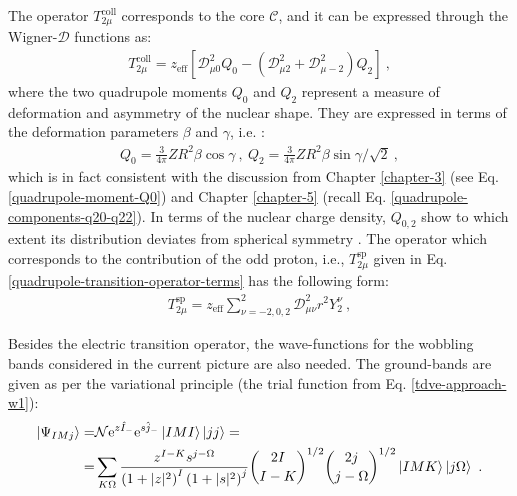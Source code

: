 The operator $T_{2\mu}^\text{coll}$ corresponds to the core $\mathscr{C}$, and it can be expressed through the Wigner-$\mathcal{D}$ functions as:
\begin{align}
    T_{2\mu}^\text{coll}=z_\text{eff}\left[\mathcal{D}_{\mu 0}^2Q_{0}-\left(\mathcal{D}_{\mu 2}^2+\mathcal{D}_{\mu -2}^2\right)Q_{2}\right]\ ,
    \label{electric-quadrupole-T-coll}
\end{align}
where the two quadrupole moments $Q_{0}$ and $Q_{2}$ represent a measure of deformation and asymmetry of the nuclear shape. They are expressed in terms of the deformation parameters $\beta$ and $\gamma$, i.e. \cite{raduta2018wobbling}:
\begin{align}
    Q_{0}=\frac{3}{4\pi}ZR^2\beta\cos\gamma\ ,\ Q_{2}=\frac{3}{4\pi}ZR^2\beta\sin\gamma/\sqrt{2}\ ,
    \label{quadrupole-components-Q0-Q2}
\end{align}
which is in fact consistent with the discussion from Chapter \ref{chapter-3} (see Eq. \ref{quadrupole-moment-Q0}) and Chapter \ref{chapter-5} (recall Eq. \ref{quadrupole-components-q20-q22}). In terms of the nuclear charge density, $Q_{0,2}$ show to which extent its distribution deviates from spherical symmetry \cite{bohr1998nuclear}. The operator which corresponds to the contribution of the odd proton, i.e.,  $T_{2\mu}^\text{sp}$ given in Eq. \ref{quadrupole-transition-operator-terms} has the following form:
\begin{align}
    T_{2\mu}^\text{sp}=z_\text{eff}\sum_{\nu=-2,0,2}^2 \mathcal{D}_{\mu\nu}^2 r^2Y_2^\nu\ ,
    \label{electric-quadrupole-T-sp}
\end{align}

Besides the electric transition operator, the wave-functions for the wobbling bands considered in the current picture are also needed. The ground-bands are given as per the variational principle (the trial function from Eq. \ref{tdve-approach-w1}):
\begin{align}
    \ket{\Psi_{IMj}}=&\mathcal{N}\mathrm{e}^{z\hat{I}_-}\mathrm{e}^{s\hat{j}_-}\ket{IMI}\ket{jj}=\nonumber\\
    =&\sum_{K\Omega}\frac{z^{I-K}s^{j-\Omega}}{\left(1+|z|^2\right)^I\left(1+|s|^2\right)^j}\binom{2I}{I-K}^{1/2}\binom{2j}{j-\Omega}^{1/2}\ket{IMK}\ket{j\Omega}\ .
    \label{wave-function-TSD1}
\end{align}

